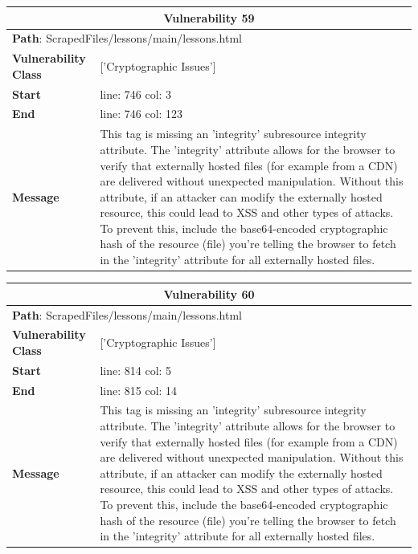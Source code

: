 \documentclass[12pt]{article}
\begin{document}
\vspace{0.7cm}
\FloatBarrier
\begin{table}[!h]
\centering
\renewcommand{\arraystretch}{1.3}
\begin{tabular}{|l|p{10cm}|}
\hline
\multicolumn{2}{|c|}{\textbf{Vulnerability 59}} \\
\hline
\multicolumn{2}{|l|}{\textbf{Path}: ScrapedFiles/lessons/main/lessons.html} \\
\hline
\textbf{Vulnerability Class} & ['Cryptographic Issues'] \\
\hline
\textbf{Start} & line: 746 \quad col: 3 \\
\hline
\textbf{End} & line: 746 \quad col: 123 \\
\hline
\textbf{Message} & This tag is missing an 'integrity' subresource integrity attribute. The 'integrity' attribute allows for the browser to verify that externally hosted files (for example from a CDN) are delivered without unexpected manipulation. Without this attribute, if an attacker can modify the externally hosted resource, this could lead to XSS and other types of attacks. To prevent this, include the base64-encoded cryptographic hash of the resource (file) you're telling the browser to fetch in the 'integrity' attribute for all externally hosted files. \\
\hline
\end{tabular}
\end{table}
\vspace{0.7cm}
\FloatBarrier
\begin{table}[!h]
\centering
\renewcommand{\arraystretch}{1.3}
\begin{tabular}{|l|p{10cm}|}
\hline
\multicolumn{2}{|c|}{\textbf{Vulnerability 60}} \\
\hline
\multicolumn{2}{|l|}{\textbf{Path}: ScrapedFiles/lessons/main/lessons.html} \\
\hline
\textbf{Vulnerability Class} & ['Cryptographic Issues'] \\
\hline
\textbf{Start} & line: 814 \quad col: 5 \\
\hline
\textbf{End} & line: 815 \quad col: 14 \\
\hline
\textbf{Message} & This tag is missing an 'integrity' subresource integrity attribute. The 'integrity' attribute allows for the browser to verify that externally hosted files (for example from a CDN) are delivered without unexpected manipulation. Without this attribute, if an attacker can modify the externally hosted resource, this could lead to XSS and other types of attacks. To prevent this, include the base64-encoded cryptographic hash of the resource (file) you're telling the browser to fetch in the 'integrity' attribute for all externally hosted files. \\
\hline
\end{tabular}
\end{table}
\end{document}

